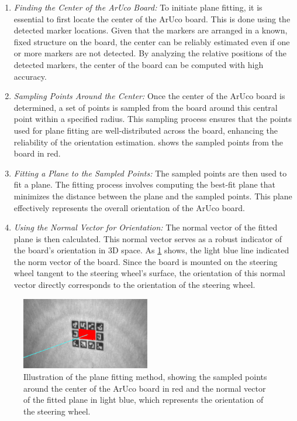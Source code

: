 \begin{enumerate}
    \item \emph{Finding the Center of the ArUco Board: }
    To initiate plane fitting, it is essential to first locate 
    the center of the ArUco board. This is done using the 
    detected marker locations. Given that the markers are 
    arranged in a known, fixed structure on the board, 
    the center can be reliably estimated even if one or more 
    markers are not detected. By analyzing the relative 
    positions of the detected markers, the center of the board 
    can be computed with high accuracy.
    \item \emph{Sampling Points Around the Center: }
    Once the center of the ArUco board is determined, 
    a set of points is sampled from the board around this 
    central point within a specified radius. This sampling 
    process ensures that the points used for plane fitting are 
    well-distributed across the board, enhancing the reliability 
    of the orientation estimation.  shows 
    the sampled points from the board in red.
    \item \emph{Fitting a Plane to the Sampled Points: }
    The sampled points are then used to fit a plane. 
    The fitting process involves computing the best-fit plane 
    that minimizes the distance between the plane and the 
    sampled points. This plane effectively represents the 
    overall orientation of the ArUco board.
    \item \emph{Using the Normal Vector for Orientation: }
    The normal vector of the fitted plane is then calculated. 
    This normal vector serves as a robust indicator of 
    the board’s orientation in 3D space. As \cref{fig:plane_fitting}
    shows, the light blue line indicated the norm vector of the board.
    Since the board is mounted on the steering wheel tangent to the 
    steering wheel's surface, the orientation of this normal vector 
    directly corresponds to the orientation of the steering wheel.
\end{enumerate}

\begin{figure}[ht]
    \centering
    \includegraphics[width=0.5\textwidth]{media/chapter 5/plane_fitting.png}
    \caption{Illustration of the plane fitting method, showing the 
    sampled points around the center of the ArUco board in red and the 
    normal vector of the fitted plane in light blue, which represents 
    the orientation of the steering wheel.}
    \label{fig:plane_fitting}
\end{figure}


